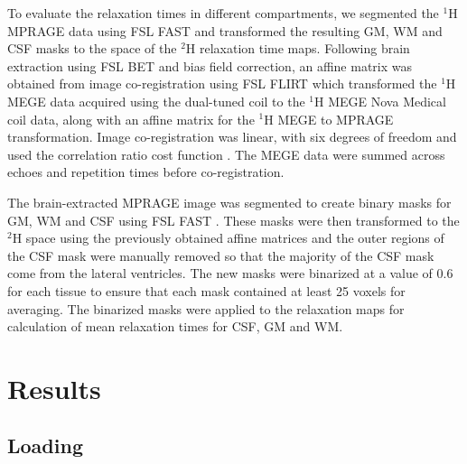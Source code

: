 To evaluate the relaxation times in different compartments, we segmented the $^1$H \ac{MPRAGE} data using FSL FAST \cite{Zhang2001SegmentationAlgorithm} and transformed the resulting \ac{GM}, \ac{WM} and \ac{CSF} masks to the space of the $^2$H relaxation time maps. Following brain extraction using FSL BET \cite{Smith2002FastExtraction} and bias field correction, an affine matrix was obtained from image co-registration using FSL FLIRT \cite{Jenkinson2001AImages,Jenkinson2002ImprovedImages} which transformed the $^1$H \ac{MEGE} data acquired using the dual-tuned coil to the $^1$H \ac{MEGE} Nova Medical coil data, along with an affine matrix for the $^1$H \ac{MEGE} to \ac{MPRAGE} transformation. Image co-registration was linear, with six degrees of freedom and used the correlation ratio cost function \cite{RocheTheRegistration}. The \ac{MEGE} data were summed across echoes and repetition times before co-registration.

The brain-extracted \ac{MPRAGE} image was segmented to create binary masks for \ac{GM}, \ac{WM} and \ac{CSF} using FSL FAST \cite{Zhang2001SegmentationAlgorithm}. These masks were then transformed to the $^2$H space using the previously obtained affine matrices and the outer regions of the CSF mask were manually removed so that the majority of the CSF mask come from the lateral ventricles. The new masks were binarized at a value of 0.6 for each tissue to ensure that each mask contained at least 25 voxels for averaging. The binarized masks were applied to the relaxation maps for calculation of mean relaxation times for \ac{CSF}, \ac{GM} and \ac{WM}.

\section{Results}
\subsection{Loading}

